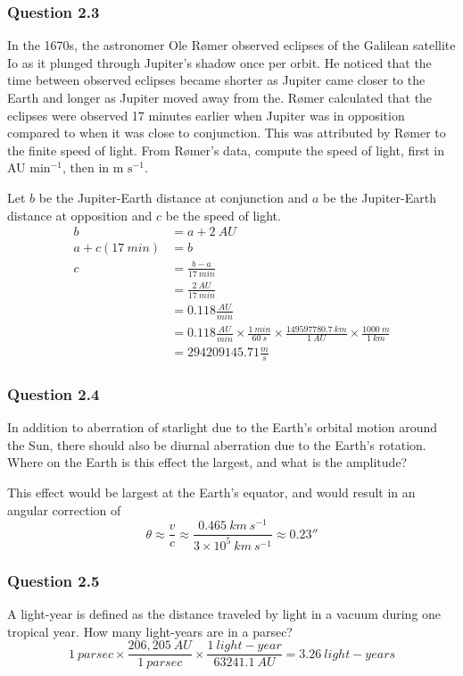 \documentclass{math}
\begin{document}
\subsubsection*{Question 2.3}
In the 1670s, the astronomer Ole R{\o}mer observed eclipses of the Galilean
satellite Io as it plunged through Jupiter's shadow once per orbit. He noticed
that the time between observed eclipses became shorter as Jupiter came closer to
the Earth and longer as Jupiter moved away from the. R{\o}mer calculated that
the eclipses were observed 17 minutes earlier when Jupiter was in opposition
compared to when it was close to conjunction. This was attributed by R{\o}mer to
the finite speed of light. From R{\o}mer's data, compute the speed of light,
first in AU \( \text{min}^{-1} \), then in m \( \text{s}^{-1} \). \par
Let \( b \) be the Jupiter-Earth distance at conjunction and \( a \) be the
Jupiter-Earth distance at opposition and \( c \) be the speed of light.
\begin{align*}
  b &= a+2~AU \\
  a+c(17~min) &= b \\
  c &= \frac{b-a}{17~min} \\
  &= \frac{2~AU}{17~min} \\
  &= 0.118\frac{AU}{min} \\
  &= 0.118\frac{AU}{min}\times\frac{1~min}{60~s}\times
    \frac{149597780.7~km}{1~AU}\times
    \frac{1000~m}{1~km} \\
  &= 294209145.71\frac{m}{s}
\end{align*}

\subsubsection*{Question 2.4}
In addition to aberration of starlight due to the Earth's orbital motion around
the Sun, there should also be diurnal aberration due to the Earth's rotation.
Where on the Earth is this effect the largest, and what is the amplitude? \par
This effect would be largest at the Earth's equator, and would result in an
angular correction of
\[ \theta \approx \frac{v}{c} \approx
  \frac{0.465~km~s^{-1}}{3\times10^5~km~s^{-1}} \approx 0.23'' \]

\subsubsection*{Question 2.5}
A light-year is defined as the distance traveled by light in a vacuum during one
tropical year. How many light-years are in a parsec?
\[ 1~parsec\times\frac{206,205~AU}{1~parsec}\times
  \frac{1~light-year}{63241.1~AU} = 3.26~light-years \]
\end{document}
